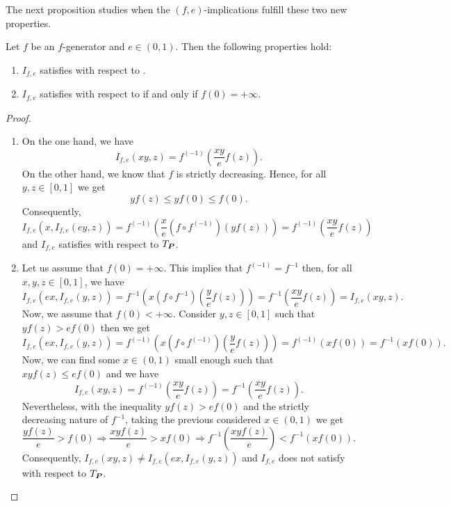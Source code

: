 The next proposition studies when the $(f,e)$-implications fulfill these two new properties. 

\begin{proposition}
	\label{LI_e(f,e)}
	Let $f$ be an $f$-generator  and $e\in(0,1)$. Then the following properties hold:
	\begin{enumerate}[label=(\roman*)]
		\item $I_{f,e}$ satisfies \LIey with respect to \TP.
		\item $I_{f,e}$ satisfies \LIex with respect to \TP if and only if $f(0)=+\infty$.
	\end{enumerate}
	\label{LIe}
\end{proposition}

\begin{proof}
	\begin{enumerate}[label=(\roman*)]
		\item On the one hand, we have
		$$I_{f,e}(xy,z)=f^{(-1)}\left(\frac{xy}{e}f(z)\right).$$
		On the other hand, we know that $f$ is strictly decreasing. Hence, for all $y,z \in [0,1]$ we get
		$$yf(z) \leq yf(0) \leq  f(0).$$
		Consequently,
		$$I_{f,e}(x,I_{f,e}(ey,z))= f^{(-1)}\left(\frac{x}{e} (f \circ f^{(-1)})(yf(z))\right) = f^{(-1)}\left(\frac{xy}{e}f(z)\right)$$
		and $I_{f,e}$ satisfies \LIey with respect to $T_{\bm{P}}$.
		\item Let us assume that $f(0)=+\infty$. This implies that $f^{(-1)}=f^{-1}$ then, for all $x,y,z \in [0,1]$, we have
		$$I_{f,e}(ex,I_{f,e}(y,z))=f^{-1}\left(x (f\circ f^{-1})\left(\frac{y}{e}f(z)\right)\right)=f^{-1}\left(\frac{xy}{e}f(z)\right) = I_{f,e}(xy,z).$$
		Now, we assume that $f(0)< + \infty$. Consider $y,z \in [0,1]$ such that $yf(z)>ef(0)$ then we get
		$$ I_{f,e}(ex,I_{f,e}(y,z)) = f^{(-1)}\left(x (f \circ f^{(-1)})\left(\frac{y}{e}f(z)\right)\right) = f^{(-1)}(xf(0))=f^{-1}(xf(0)).$$
		Now, we can find some $x \in (0,1)$ small enough such that $xyf(z) \leq ef(0)$ and we have
		$$I_{f,e}(xy,z)=f^{(-1)}\left(\frac{xy}{e}f(z)\right) = f^{-1} \left( \frac{xy}{e}f(z)\right).$$
		Nevertheless, with the inequality $yf(z)>ef(0)$ and the strictly decreasing nature of $f^{-1}$, taking the previous considered $x \in (0,1)$ we get 
		$$ \frac{yf(z)}{e} > f(0) \Rightarrow \frac{xyf(z)}{e} > xf(0) \Rightarrow f^{-1}\left(\frac{xyf(z)}{e}\right) < f^{-1}(xf(0)).$$
		Consequently, $I_{f,e}(xy,z) \not = I_{f,e}(ex,I_{f,e}(y,z))$ and $I_{f,e}$ does not satisfy \LIex with respect to $T_{\bm{P}}$.
	\end{enumerate}
\end{proof}

